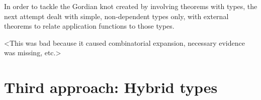 \documentclass[preprint]{sigplanconf}
\begin{document}
In order to tackle the Gordian knot created by involving theorems with types,
the next attempt dealt with simple, non-dependent types only, with external
theorems to relate application functions to those types.

<This was bad because it caused combinatorial expansion, necessary evidence
was missing, etc.>

\section{Third approach: Hybrid types}

% 
% 
% 
% 
% 
% 
% 
% 
% 
% 
% 
% 
% 
% 
% 
\end{document}
